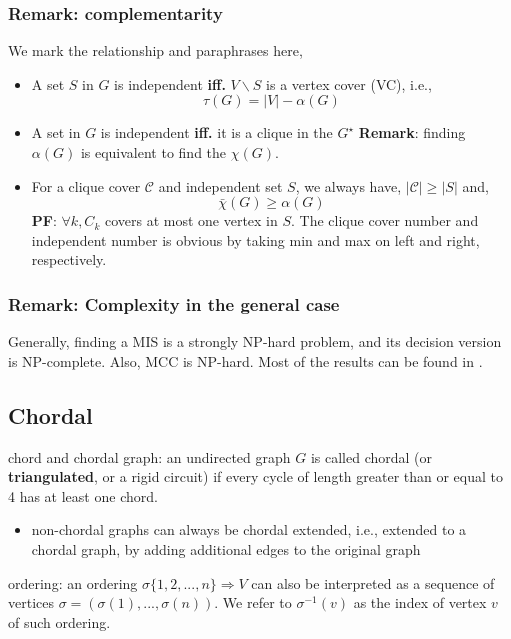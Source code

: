\subsubsection*{Remark: complementarity}
We mark the relationship and paraphrases here,
\begin{itemize}
      \item A set \(S\) in \(G\) is independent \textbf{iff.} \(V\backslash S\) is a vertex cover (VC), i.e.,
            \[\tau(G) = |V| - \alpha(G)\]
      \item A set in \(G\) is independent \textbf{iff.} it is a clique in the \(G^\star\)
            \textbf{Remark}: finding \(\alpha(G)\) is equivalent to find the \(\chi(G)\).
      \item For a clique cover \(\mathscr C\) and independent set \(S\), we always have, \(|\mathscr C| \ge |S|\) and,
            \[\bar \chi (G) \ge \alpha(G)\]
            \textbf{PF}: \(\forall k, C_k \) covers at most one vertex in \(S\). The clique cover number and independent number is obvious by taking min and max on left and right, respectively.
\end{itemize}

\subsubsection*{Remark: Complexity in the general case}

Generally, finding a MIS is a strongly NP-hard problem, and its decision version is NP-complete. Also, MCC is NP-hard.
Most of the results can be found in \cite{schrijver_combinatorial_2003}.


\subsection{Chordal}

chord and chordal graph: an undirected graph \(G\) is called chordal
(or \textbf{triangulated}, or a rigid circuit) if every cycle of
length greater than or equal to 4 has at least one chord.

\begin{itemize}
      \tightlist
      \item non-chordal graphs can always be chordal extended, i.e., extended to  a chordal graph, by adding additional edges to the original graph
\end{itemize}

ordering: an ordering \(\sigma \{1, 2, ... , n\} \Rightarrow V\) can
also be interpreted as a sequence of vertices
\(\sigma = (\sigma(1), ... , \sigma(n))\). We refer to
\(\sigma^{−1} (v)\) as the index of vertex \(v\) of such ordering.

